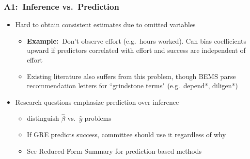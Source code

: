 \documentclass[12pt, aspectratio=169]{beamer}
\begin{document}
\begin{frame}[label=ivp]
\frametitle{A1:\ Inference vs.\ Prediction}
\begin{itemize}
\item Hard to obtain consistent estimates due to omitted variables
\vspace{5pt}
\begin{itemize}
\item \textbf{Example:}\ Don't observe effort (e.g.\ hours worked). Can bias coefficients upward if predictors correlated with effort and success are independent of effort
\vspace{5pt}
\item Existing literature also suffers from this problem, though BEMS  parse recommendation letters for ``grindstone terms" (e.g.\ depend*, diligen*)
\vspace{10pt}
\end{itemize}
\item Research questions emphasize prediction over inference
\vspace{5pt}
\begin{itemize}
\item \citet{mullainathan2017} distinguish $\hat\beta$ vs.\ $\hat y$ problems
\vspace{5pt}
\item If GRE predicts success, committee should use it regardless of why
\vspace{5pt}
\item See Reduced-Form Summary for prediction-based methods
\vspace{10pt}
\end{itemize}
\end{itemize}
\hyperlink{dd}{}
\end{frame}
\end{document}
